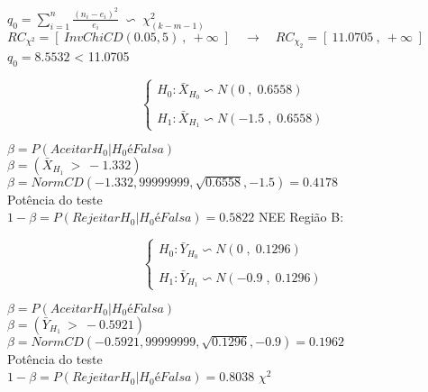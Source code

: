 $q_0=\sum_{i=1}^n \frac{(n_i-e_i)^2}{e_i} \;\backsim\; \chi_{(k-m-1)}^2$
\newline
\vspace{1cm}
\newline
$RC_{\chi^2}=\left[ \: InvChiCD(0.05,5) \:,\: +\infty \; \right] \quad \rightarrow \quad RC_{\chi_2}=\left[ \: 11.0705 \:,\: +\infty \; \right]$
\newline
\vspace{1cm}
\newline
$q_0=8.5532$ < 11.0705
\newline
\vspace{1cm}
\newline
\begin{minipage}[l]{0pt}
	$$\left\lbrace\begin{array}{l}
		H_0: \bar{X}_{H_0} \backsim N (0 \;,\; 0.6558) \\
		\\
		H_1: \bar{X}_{H_1} \backsim N (-1.5 \;,\; 0.6558)
	\end{array}\right.$$
\end{minipage}
\newline
\vspace{1cm}
\newline
$\beta=P(Aceitar H_0 | H_0 é Falsa)$ \\
$\beta=(\bar{X}_{H_1} \:>\: -1.332)$	\\
$\beta=NormCD(-1.332,99999999,\sqrt{0.6558},-1.5)=0.4178$ \\
Potência do teste \\
$1-\beta=P(Rejeitar H_0 | H_0 é Falsa)=0.5822$
\newline
\vspace{1cm}
\newline
NEE Região B:\\
\begin{minipage}[l]{0pt}
	$$\left\lbrace\begin{array}{l}
		H_0: \bar{Y}_{H_0} \backsim N (0 \;,\; 0.1296) \\
		\\
		H_1: \bar{Y}_{H_1} \backsim N (-0.9 \;,\; 0.1296)
	\end{array}\right.$$
\end{minipage}
\newline
\vspace{1cm}
\newline
$\beta=P(Aceitar H_0 | H_0 é Falsa)$ \\
$\beta=(\bar{Y}_{H_1} \:>\: -0.5921)$	\\
$\beta=NormCD(-0.5921,99999999,\sqrt{0.1296},-0.9)=0.1962$ \\
Potência do teste \\
$1-\beta=P(Rejeitar H_0 | H_0 é Falsa)=0.8038$
\newline
\vspace{1cm}
\newline
$\chi^2$
